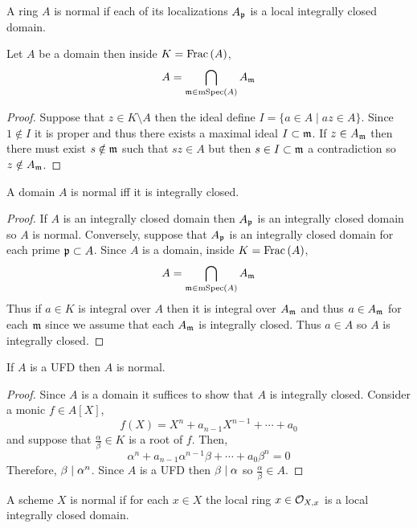 \documentclass[12pt]{article}
\begin{document}
\begin{definition}
A ring $A$ is normal if each of its localizations $A_{\mathfrak{p}}$ is a local integrally closed domain. 
\end{definition}

\begin{lemma}
Let $A$ be a domain then inside $K = \mathrm{Frac}\left(A\right)$,
\[ A = \bigcap_{\mathfrak{m} \in \mathrm{mSpec}\left( A \right)} A_{\mathfrak{m}} \] 
\end{lemma}

\begin{proof}
Suppose that $z \in K \setminus A$ then the ideal define $I = \{ a \in A \mid a z \in A \}$. Since $1 \notin I$ it is proper and thus there exists a maximal ideal $I \subset \mathfrak{m}$. If $z \in A_{\mathfrak{m}}$ then there must exist $s \notin \mathfrak{m}$ such that $sz \in A$ but then $s \in I \subset \mathfrak{m}$ a contradiction so $z \notin A_{\mathfrak{m}}$. 
\end{proof}

\begin{lemma}
A domain $A$ is normal iff it is integrally closed.
\end{lemma}

\begin{proof}
If $A$ is an integrally closed domain then $A_{\mathfrak{p}}$ is an integrally closed domain so $A$ is normal. Conversely, suppose that $A_{\mathfrak{p}}$ is an integrally closed domain for each prime $\mathfrak{p} \subset A$. Since $A$ is a domain, inside $K = \mathrm{Frac}\left(A\right)$,
\[ A = \bigcap_{\mathfrak{m} \in \mathrm{mSpec}\left( A \right)} A_{\mathfrak{m}} \] 
Thus if $a \in K$ is integral over $A$ then it is integral over $A_{\mathfrak{m}}$ and thus $a \in A_{\mathfrak{m}}$ for each $\mathfrak{m}$ since we assume that each $A_{\mathfrak{m}}$ is integrally closed. Thus $a \in A$ so $A$ is integrally closed.
\end{proof}

\begin{proposition}
If $A$ is a UFD then $A$ is normal.
\end{proposition}

\begin{proof}
Since $A$ is a domain it suffices to show that $A$ is integrally closed. Consider a monic $f \in A[X]$,
\[ f(X) = X^n + a_{n-1} X^{n-1} + \cdots + a_0 \]
and suppose that $\frac{\alpha}{\beta} \in K$ is a root of $f$. Then,
\[ \alpha^n + a_{n-1} \alpha^{n-1} \beta + \cdots + a_0 \beta^n = 0 \]
Therefore, $\beta \mid \alpha^n$. Since $A$ is a UFD then $\beta \mid \alpha$ so $\frac{\alpha}{\beta} \in A$. 
\end{proof}

\begin{definition}
A scheme $X$ is normal if for each $x \in X$ the local ring $x \in \mathcal{O}_{X, x}$ is a local integrally closed domain.  
\end{definition}
\end{document}
